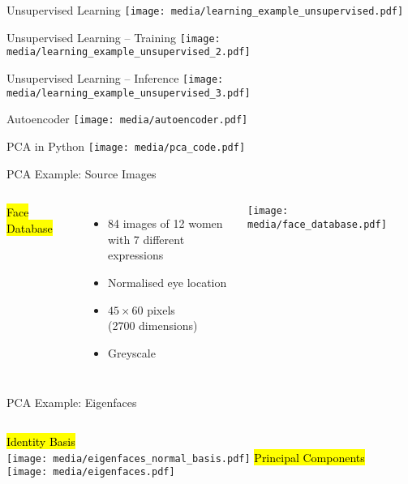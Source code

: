 \documentclass[handout,aspectratio=169]{beamer}
\begin{document}
	\begin{frame}{Unsupervised Learning}
		\centering
		\texttt{[image: media/learning\_example\_unsupervised.pdf]}
	\end{frame}
	
	\begin{frame}{Unsupervised Learning -- Training}
		\centering
		\texttt{[image: media/learning\_example\_unsupervised\_2.pdf]}
	\end{frame}
	
	\begin{frame}{Unsupervised Learning -- Inference}
		\centering
		\texttt{[image: media/learning\_example\_unsupervised\_3.pdf]}
	\end{frame}

	\begin{frame}{Autoencoder}
		\centering
		\texttt{[image: media/autoencoder.pdf]}
	\end{frame}


	\begin{frame}{PCA in Python}
		\centering
		\texttt{[image: media/pca\_code.pdf]}
	\end{frame}

	\begin{frame}{PCA Example: Source Images}
		\centering
		\begin{columns}[c]
			\hl{Face Database}
			\begin{itemize}
				\item 84 images of 12 women\\with 7 different expressions
				\item Normalised eye location
				\item $45 \times 60$ pixels\\(2700 dimensions)
				\item Greyscale
			\end{itemize}
			\texttt{[image: media/face\_database.pdf]}
		\end{columns}
	\end{frame}

	\begin{frame}{PCA Example: Eigenfaces}
		\begin{columns}
			\centering
			\hl{Identity Basis}\\
			\texttt{[image: media/eigenfaces\_normal\_basis.pdf]}
			\centering
			\hl{Principal Components}\\
			\texttt{[image: media/eigenfaces.pdf]}
		\end{columns}		
	\end{frame}
\end{document}
